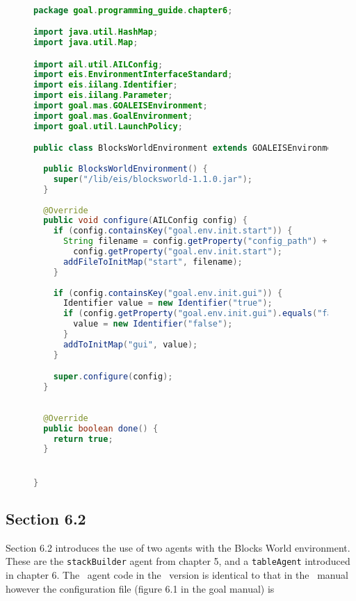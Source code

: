 \begin{figure}[!htpb]
\begin{ourexample}
\label{code:blocksworld} \quad \\
\begin{lstlisting}[basicstyle=\sffamily,language=Java,style=easslisting]
package goal.programming_guide.chapter6;

import java.util.HashMap;
import java.util.Map;

import ail.util.AILConfig;
import eis.EnvironmentInterfaceStandard;
import eis.iilang.Identifier;
import eis.iilang.Parameter;
import goal.mas.GOALEISEnvironment;
import goal.mas.GoalEnvironment;
import goal.util.LaunchPolicy;

public class BlocksWorldEnvironment extends GOALEISEnvironment {
	
  public BlocksWorldEnvironment() {
    super("/lib/eis/blocksworld-1.1.0.jar");		
  }
	
  @Override
  public void configure(AILConfig config) {
    if (config.containsKey("goal.env.init.start")) {
      String filename = config.getProperty("config_path") + "/" +
        config.getProperty("goal.env.init.start");
      addFileToInitMap("start", filename);
    }
		
    if (config.containsKey("goal.env.init.gui")) {
      Identifier value = new Identifier("true");
      if (config.getProperty("goal.env.init.gui").equals("false")) {
        value = new Identifier("false");
      }
      addToInitMap("gui", value);
    }

    super.configure(config);
  }
	
	
  @Override
  public boolean done() {
    return true;
  }


}
\end{lstlisting}
\end{ourexample}
\end{figure}

\subsection{Section 6.2}
\label{sec:6.2}

Section 6.2 introduces the use of two agents with the Blocks World environment.  These are the \texttt{stackBuilder} agent from chapter 5, and a \texttt{tableAgent} introduced in chapter 6.  The \goal\ agent code in the \ail\ version is identical to that in the \goal\ manual however the configuration file (figure 6.1 in the goal manual) is

